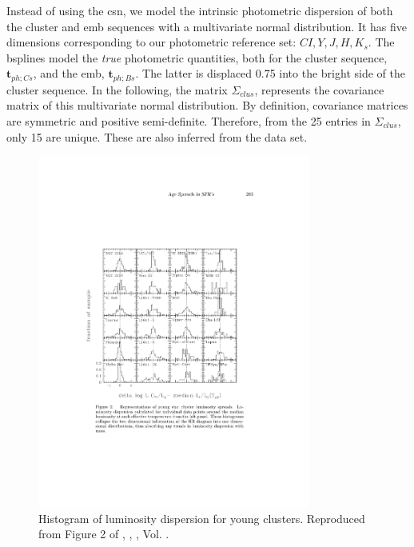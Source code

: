 Instead of using the \gls{csn}, we model the intrinsic photometric  dispersion of both the cluster and \gls{emb} sequences with a multivariate normal distribution. It has five dimensions corresponding to our photometric reference set: $CI,Y,J,H,K_s$. The \glspl{bspline} model the \emph{true} photometric quantities, both for the cluster sequence, $\mathbf{t}_{ph;Cs}$, and the \gls{emb}, $\mathbf{t}_{ph;Bs}$. The latter is displaced 0.75 into the bright side of the cluster sequence. In the following, the matrix $\Sigma_{clus}$, represents the covariance matrix of this multivariate normal distribution. By definition, covariance matrices are symmetric and positive semi-definite. Therefore, from the 25 entries in $\Sigma_{clus}$, only 15 are unique. These are also inferred from the data set.


\begin{figure}[ht!]
\begin{center}
\includegraphics[width=0.8\textwidth]{background/Figures/F2_Hillenbrand2008.pdf}
\caption{Histogram of luminosity dispersion for young clusters. Reproduced from Figure 2 of \citet{2008ASPC..384..200H}, \textit{}, , Vol. .}
\label{fig:luminosity_dispersion}
\end{center}
\end{figure}


